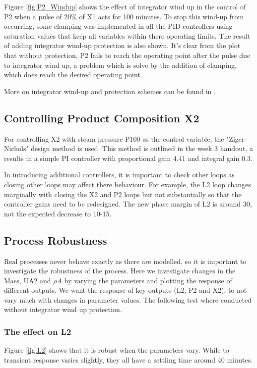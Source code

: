 \documentclass[11pt]{article}
\begin{document}
Figure \ref{fig:P2_Windup} shows the effect of integrator wind up in the control of P2 when a pulse of 20\% of X1 acts for 100 minutes. To stop this wind-up from occurring, some clamping was implemented in all the PID controllers using saturation values that keep all variables within there operating limits. The result of adding integrator wind-up protection is also shown. It's clear from the plot that without protection, P2 fails to reach the operating point after the pulse due to integrator wind up, a problem which is solve by the addition of clamping, which does reach the desired operating point.

More on integrator wind-up and protection schemes can be found in \cite{windup}.

\subsection{Controlling Product Composition X2}
For controlling X2 with steam pressure P100 as the control variable, the "Ziger-Nichols" design method is used. This method is outlined in the week 3 handout, a results in a simple PI controller with proportional gain 4.41 and integral gain 0.3. 

In introducing additional controllers, it is important to check other loops as closing other loops may affect there behaviour. For example, the L2 loop changes marginally with closing the X2 and P2 loops but not substantially so that the controller gains need to be redesigned. The new phase margin of L2 is around 30, not the expected decrease to 10-15.

\subsection{Process Robustness}
Real processes never behave exactly as there are modelled, so it is important to investigate the robustness of the process. Here we investigate changes in the Mass, UA2 and $\rho A$ by varying the parameters and plotting the response of different outputs. We want the response of key outputs (L2, P2 and X2), to not vary much with changes in parameter values. The following test where conducted without integrator wind up protection.

\subsubsection{The effect on L2}
Figure \ref{fig:L2} shows that it is robust when the parameters vary. While to transient response varies slightly, they all have a settling time around 40 minutes.
\end{document}
